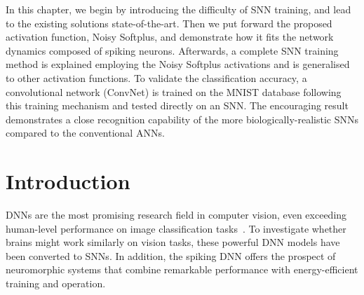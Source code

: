 
In this chapter, we begin by introducing the difficulty of SNN training, and lead to the existing solutions state-of-the-art.
Then we put forward the proposed activation function, Noisy Softplus, and demonstrate how it fits the network dynamics composed of spiking neurons.
Afterwards, a complete SNN training method is explained employing the Noisy Softplus activations and is generalised to other activation functions.
To validate the classification accuracy, a convolutional network (ConvNet) is trained on the MNIST database following this training mechanism and tested directly on an SNN.
The encouraging result demonstrates a close recognition capability of the more biologically-realistic SNNs compared to the conventional ANNs.

\section{Introduction}	
DNNs are the most promising research field in computer vision, even exceeding human-level performance on image classification tasks~\cite{he2015delving}.
To investigate whether brains might work similarly on vision tasks, these powerful DNN models have been converted to SNNs.
In addition, the spiking DNN offers the prospect of neuromorphic systems that combine remarkable performance with energy-efficient training and operation.


